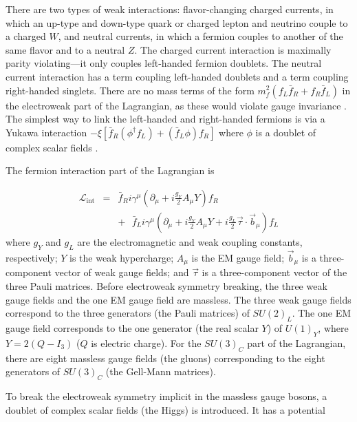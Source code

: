 \documentclass[dissertation.tex]{subfiles}
\begin{document}
There are two types of weak interactions: flavor-changing charged currents, in which an up-type and down-type quark or charged lepton and neutrino couple to a charged $W$, and neutral currents, in which a fermion couples to another of the same flavor and to a neutral $Z$.  The charged current interaction is maximally parity violating---it only couples left-handed fermion doublets.  The neutral current interaction has a term coupling left-handed doublets and a term coupling right-handed singlets.  There are no mass terms of the form $m_{f}^{2}(f_{L}\bar{f}_{R} + f_{R}\bar{f}_{L})$ in the electroweak part of the Lagrangian, as these would violate gauge invariance \cite{rosner2001flavor}.  The simplest way to link the left-handed and right-handed fermions is via a Yukawa interaction $-\xi\left[\bar{f}_{R}(\phi^{\dagger}f_{L}) + (\bar{f}_{L}\phi)f_{R}\right]$ where $\phi$ is a doublet of complex scalar fields \cite{rosner2001flavor}.

The fermion interaction part of the Lagrangian is \cite{rosner2001flavor}

\begin{eqnarray}
\mathcal{L}_{\mathrm{int}} &=& \bar{f}_{R}i\gamma^{\mu}(\partial_{\mu} + i\frac{g_{Y}}{2}A_{\mu}Y)f_{R} \nonumber \\
&&+\mbox{ }\bar{f}_{L}i\gamma^{\mu}(\partial_{\mu} + i\frac{g_{Y}}{2}A_{\mu}Y + i\frac{g_{L}}{2}\overrightarrow{\tau}\cdot\overrightarrow{b}_{\mu})f_{L}
\end{eqnarray}
%
where $g_{Y}$ and $g_{L}$ are the electromagnetic and weak coupling constants, respectively; $Y$ is the weak hypercharge; $A_{\mu}$ is the EM gauge field; $\overrightarrow{b}_{\mu}$ is a three-component vector of weak gauge fields; and $\overrightarrow{\tau}$ is a three-component vector of the three Pauli matrices.  Before electroweak symmetry breaking, the three weak gauge fields and the one EM gauge field are massless.  The three weak gauge fields correspond to the three generators (the Pauli matrices) of $SU(2)_{L}$.  The one EM gauge field corresponds to the one generator (the real scalar $Y$) of $U(1)_{Y}$, where $Y = 2(Q - I_{3})$ ($Q$ is electric charge).  For the $SU(3)_{C}$ part of the Lagrangian, there are eight massless gauge fields (the gluons) corresponding to the eight generators of $SU(3)_{C}$ (the Gell-Mann matrices).

To break the electroweak symmetry implicit in the massless gauge bosons, a doublet of complex scalar fields (the Higgs) is introduced.  It has a potential \cite{rosner2001flavor}
\end{document}
